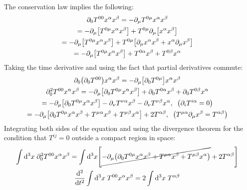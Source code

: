 \documentclass{report}
\theoremstyle{definition}
\begin{document}
\begin{chapter1}
	The conservation law implies the following:
	\begin{gather*}
		\partial_0 T^{00}x^{\alpha}x^{\beta} = -\partial_{\mu}T^{0\mu}x^{\alpha}x^{\beta} \\
		= -\partial_{\mu}\bqty{T^{0\mu}x^{\alpha}x^{\beta}} + T^{0\mu}\partial_{\mu}\bqty{x^{\alpha}x^{\beta}} \\
		= -\partial_{\mu}\bqty{T^{0\mu}x^{\alpha}x^{\beta}} + T^{0\mu}\bqty{\partial_{\mu}x^{\alpha}x^{\beta} + x^{\alpha}\partial_{\mu}x^{\beta}} \\
		=  -\partial_{\mu}\bqty{T^{0\mu}x^{\alpha}x^{\beta}} + T^{0\alpha}x^{\beta} + T^{0\beta}x^{\alpha}
	\end{gather*}
	Taking the time derivative and using the fact that partial derivatives commute:
	\begin{gather*}
		\partial_0\pqty{\partial_0 T^{00}}x^{\alpha}x^{\beta} = -\partial_{\mu}\bqty{\partial_0 T^{0\mu}}x^{\alpha}x^{\beta} \\
		\partial^2_0 T^{00}x^{\alpha}x^{\beta} = -\partial_{\mu}\bqty{\partial_0 T^{0\mu}x^{\alpha}x^{\beta}} + \partial_0 T^{0\alpha}x^{\beta} + \partial_0 T^{0\beta}x^{\alpha} \\
		= -\partial_{\mu}\bqty{\partial_0 T^{0\mu}x^{\alpha}x^{\beta}} - \partial_{\nu}T^{\nu\alpha}x^{\beta} - \partial_{\nu}T^{\nu\beta}x^{\alpha}, \;\; \pqty{\partial_i T^{i\alpha} = 0} \\
		= -\partial_{\mu}\bqty{\partial_0 T^{0\mu}x^{\alpha}x^{\beta} + T^{\mu\alpha}x^{\beta} + T^{\mu\beta}x^{\alpha}} + 2 T^{\alpha\beta}, \;\; \pqty{T^{\mu\alpha}\partial_{\mu}x^{\beta} = T^{\alpha\beta}}
	\end{gather*}
	Integrating both sides of the equation and using the divergence theorem for the condition that $T^{ij} = 0$ outside a compact region in space:
	\begin{gather*}
		\int \dd^3{x}\;\partial^2_0 T^{00} x^{\alpha}x^{\beta} = \int \dd^3{x} \bqty{ \cancel{-\partial_{\mu}\pqty{\partial_0 T^{0\mu}x^{\alpha}x^{\beta} + T^{\mu\alpha}x^{\beta} + T^{\mu\beta}x^{\alpha}}} + 2 T^{\alpha\beta}} \\
		\dv[2]{t}\int \dd^3{x}\;T^{00} x^{\alpha} x^{\beta} = 2 \int \dd^3{x}\; T^{\alpha\beta}
	\end{gather*}
\end{chapter1}
\end{document}
